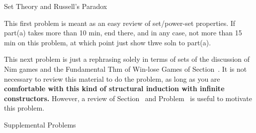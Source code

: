 \documentclass[handout]{mcs}
\begin{document}

\begin{staffnotes}
Set Theory and Russell's Paradox
\end{staffnotes}


\begin{staffnotes}
This first problem is meant as an easy review of set/power-set
properties.  If part(a) takes more than 10 min, end there, and in any
case, not more than 15 min on this problem, at which point just show
thwe soln to part(a).
\end{staffnotes}


\begin{staffnotes}
This next problem is just a rephrasing solely in terms of sets of the
discussion of Nim games and the Fundamental Thm of Win-lose Games of
Section~.  It is not necessary to review this
material to do the problem, as long as you are \textbf{comfortable
  with this kind of structural induction with infinite constructors.}
However, a review of Section~ and
Problem~ is useful to motivate this problem.
\end{staffnotes}





\begin{center}
Supplemental Problems
\end{center}






\end{document}
